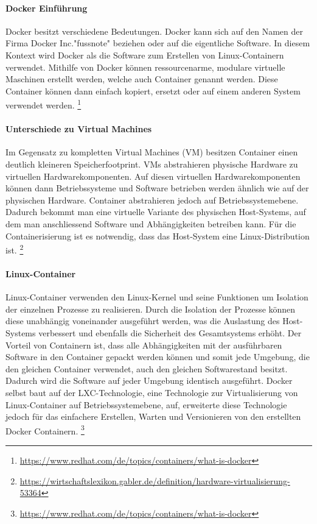 \paragraph{Docker Einführung}
Docker besitzt verschiedene Bedeutungen. Docker kann sich auf den Namen der Firma Docker Inc."fussnote" beziehen oder auf die eigentliche Software.
In diesem Kontext wird Docker als die Software zum Erstellen von Linux-Containern verwendet.
Mithilfe von Docker können ressourcenarme, modulare virtuelle Maschinen erstellt werden, welche auch Container genannt werden.
Diese Container können dann einfach kopiert, ersetzt oder auf einem anderen System verwendet werden.
\footnote{\url{https://www.redhat.com/de/topics/containers/what-is-docker}}

\paragraph{Unterschiede zu Virtual Machines}
Im Gegensatz zu kompletten Virtual Machines (VM) besitzen Container einen deutlich kleineren Speicherfootprint.
VMs abstrahieren physische Hardware zu virtuellen Hardwarekomponenten. Auf diesen virtuellen Hardwarekomponenten können dann Betriebssysteme
und Software betrieben werden ähnlich wie auf der physischen Hardware.
Container abstrahieren jedoch auf Betriebssystemebene.
Dadurch bekommt man eine virtuelle Variante des physischen Host-Systems, auf dem man anschliessend Software und Abhängigkeiten betreiben kann.
Für die Containerisierung ist es notwendig, dass das Host-System eine Linux-Distribution ist.
\footnote{\url{https://wirtschaftslexikon.gabler.de/definition/hardware-virtualisierung-53364}}

\paragraph{Linux-Container}
Linux-Container verwenden den Linux-Kernel und seine Funktionen um Isolation der einzelnen Prozesse zu realisieren.
Durch die Isolation der Prozesse können diese unabhängig voneinander ausgeführt werden,
was die Auslastung des Host-Systems verbessert und ebenfalls die Sicherheit des Gesamtsystems erhöht.
Der Vorteil von Containern ist, dass alle Abhängigkeiten mit der ausführbaren Software in den Container gepackt werden können und somit jede
Umgebung, die den gleichen Container verwendet, auch den gleichen Softwarestand besitzt.
Dadurch wird die Software auf jeder Umgebung identisch ausgeführt.
Docker selbst baut auf der LXC-Technologie, eine Technologie zur Virtualisierung von Linux-Container auf Betriebssystemebene, auf,
erweiterte diese Technologie jedoch für das einfachere Erstellen, Warten und Versionieren von den erstellten Docker Containern.
\footnote{\url{https://www.redhat.com/de/topics/containers/what-is-docker}}

